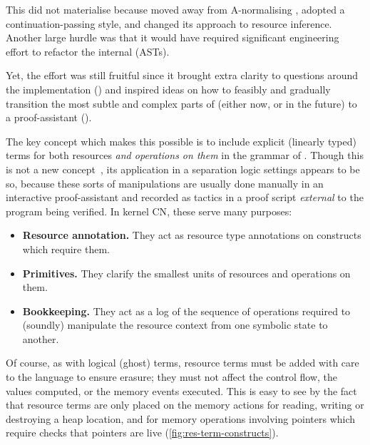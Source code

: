 This did not materialise because  moved away from A-normalising
, adopted a continuation-passing style, and changed its approach to
resource inference. Another large hurdle was that it would have required
significant engineering effort to refactor the internal  (ASTs).

Yet, the effort was still fruitful since it brought extra clarity to questions
around the implementation () and inspired ideas on
how to feasibly and gradually transition the most subtle and complex parts of
 (either now, or in the future) to a
proof-assistant ().

The key concept which makes this possible is to include explicit (linearly
typed) terms for both resources \emph{and operations on them} in the grammar of
. Though this is not a new
concept~, its application in a
separation logic settings appears to be so, because these sorts of
manipulations are usually done manually in an interactive proof-assistant and
recorded as tactics in a proof script \emph{external} to the program being
verified. In {kernel CN}, these  serve many purposes:
\begin{itemize}
    \item \textbf{Resource annotation.} They act as resource type annotations
        on constructs which require them.
    \item \textbf{Primitives.} They clarify the smallest units of
        resources and operations on them.
    \item \textbf{Bookkeeping.} They act as a log of the sequence of operations
        required to (soundly) manipulate the resource context from one symbolic
        state to another.
\end{itemize}

Of course, as with logical (ghost) terms, resource terms must be added with
care to the language to ensure erasure; they must not affect the control flow,
the values computed, or the memory events executed. This is easy to see by the
fact that resource terms are only placed on the memory actions for reading,
writing or destroying a heap location, and for memory operations involving
pointers which require checks that pointers are live (\cref{fig:res-term-constructs}).

